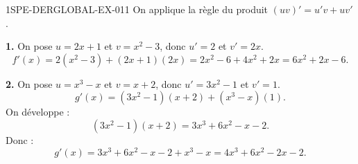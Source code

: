 \begin{corrige}{1SPE-DERGLOBAL-EX-011}
On applique la règle du produit $(uv)' = u'v + uv'$.

\textbf{1.} On pose $u = 2x+1$ et $v = x^2-3$, donc $u' = 2$ et $v' = 2x$.
\[
f'(x) = 2(x^2-3) + (2x+1)(2x) = 2x^2 - 6 + 4x^2 + 2x = \boxed{6x^2 + 2x - 6}.
\]

\textbf{2.} On pose $u = x^3-x$ et $v = x+2$, donc $u' = 3x^2-1$ et $v' = 1$.
\[
g'(x) = (3x^2-1)(x+2) + (x^3-x)(1).
\]
On développe :
\[
(3x^2-1)(x+2) = 3x^3 + 6x^2 - x - 2.
\]
Donc :
\[
g'(x) = 3x^3 + 6x^2 - x - 2 + x^3 - x = \boxed{4x^3 + 6x^2 - 2x - 2}.
\]
\end{corrige}
